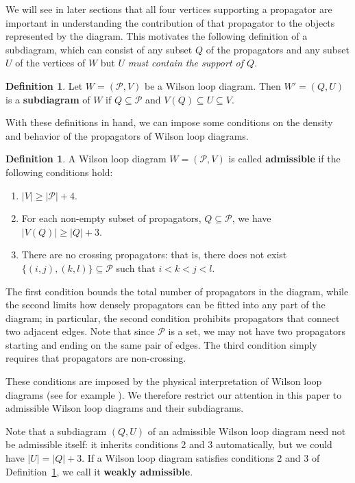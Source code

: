 \documentclass[11pt]{article}
\newcommand{\cP}{\mathcal{P}}
\theoremstyle{remark}
\theoremstyle{definition}
\newtheorem{dfn}[thm]{Definition}
\begin{document}
We will see in later sections that all four vertices supporting a propagator are important in understanding the contribution of that propagator to the objects represented by the diagram. This motivates the following definition of a subdiagram, which can consist of any subset $Q$ of the propagators and any subset $U$ of the vertices of $W$ but $U$ {\em must contain the support of $Q$}.

\begin{dfn} \label{subdiagramdfn}
Let $W = (\cP, V)$ be a Wilson loop diagram. Then $W' = (Q,U)$ is a {\bf subdiagram} of $W$ if $Q \subseteq \cP$ and $V(Q) \subseteq U \subseteq V$.
\end{dfn}



With these definitions in hand, we can impose some conditions on the density and behavior of the propagators of Wilson loop diagrams.

\begin{dfn}\label{admisdfn}
A Wilson loop diagram $W = (\cP, V)$ is called {\bf admissible} if the following conditions hold:
\begin{enumerate}
\item $|V| \geq |\cP| + 4$.
\item For each non-empty subset of propagators, $Q \subseteq \cP$, we have $|V(Q)|\geq |Q| + 3$.
\item There are no crossing propagators: that is, there does not exist ${\{(i,j),(k,l)\} \subseteq \cP}$ such that $i < k < j < l$.
\end{enumerate}
 \end{dfn}

The first condition bounds the total number of propagators in the diagram, while the second limits how densely propagators can be fitted into any part of the diagram; in particular, the second condition prohibits propagators that connect two adjacent edges.  Note that since $\cP$ is a set, we may not have two propagators starting and ending on the same pair of edges. The third condition simply requires that propagators are non-crossing. 

These conditions are imposed by the physical interpretation of Wilson loop diagrams (see for example \cite{Adamo:2011pv,Adamo:2012xe,wilsonloop,LipsteinMason}). We therefore restrict our attention in this paper to admissible Wilson loop diagrams and their subdiagrams. 

Note that a subdiagram $(Q,U)$ of an admissible Wilson loop diagram need not be admissible itself: it inherits conditions 2 and 3 automatically, but we could have $|U| = |Q| + 3$. If a Wilson loop diagram satisfies conditions 2 and 3 of Definition~\ref{admisdfn}, we call it {\bf weakly admissible}.
\end{document}
